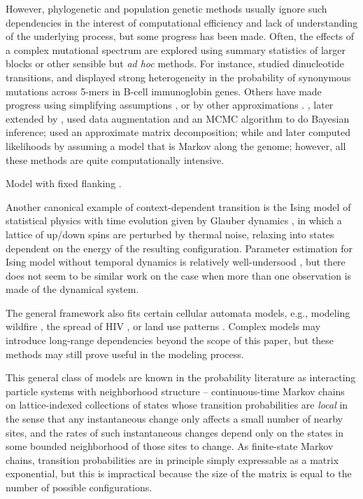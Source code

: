 \documentclass{article}
\theoremstyle{plain}
\theoremstyle{definition}
\begin{document}
However, phylogenetic and population genetic methods usually ignore such dependencies
in the interest of computational efficiency and lack of understanding of the underlying process,
but some progress has been made.
Often, the effects of a complex mutational spectrum are explored using summary statistics of larger blocks or other sensible but \textit{ad hoc} methods.
For instance, \citet{arndt2003sequence} studied dinucleotide transitions,
and \citet{yaari2013models} displayed strong heterogeneity in the probability of synonymous mutations across 5-mers
in B-cell immunoglobin genes.
Others have made progress using simplifying assumptions \citep{berard2012accurate},
or by other approximations \citep{christensen2005pseudolikelihood}.
\citet{pedersen2000dependent}, later extended by
\citet{Hwang2004-pj,hobolth2008markov,baele2010using}, used data augmentation and an MCMC algorithm to do Bayesian inference;
\citet{lunter2004nucleotide} used an approximate matrix decomposition;
while \citet{siepel2004phylogenetic} and later \citep{baele2010modelling} computed likelihoods by assuming a model that is Markov along the genome;
however, all these methods are quite computationally intensive.

Model with fixed flanking \citet{saunders2007insights}.

Another canonical example of context-dependent transition is the Ising model of statistical physics
with time evolution given by Glauber dynamics \citep{glauber1963timedependent},
in which a lattice of up/down spins are perturbed by thermal noise,
relaxing into states dependent on the energy of the resulting configuration.
Parameter estimation for Ising model without temporal dynamics
is relatively well-undersood \citep{pickard1982inference,frigessi1990parameter},
but there does not seem to be similar work on the case when more than one observation is made of the dynamical system.

The general framework also fits certain cellular automata models,
e.g., modeling wildfire \citep{clarke1994cellular},
the spread of HIV \citep{zorzenondossantos2001dynamics},
or land use patterns \citep{wu2002calibration}.
Complex models may introduce long-range dependencies beyond the scope of this paper,
but these methods may still prove useful in the modeling process.


This general class of models are known in the probability literature as
interacting particle systems \citep{liggett2005ips} with neighborhood structure
-- continuous-time Markov chains on lattice-indexed collections of states
whose transition probabilities are \emph{local}
in the sense that any instantaneous change only affects a small number of nearby sites,
and the rates of such instantaneous changes depend only on the states in some bounded neighborhood of those sites to change.
As finite-state Markov chains,
transition probabilities are in principle simply expressable as a matrix exponential,
but this is impractical because the size of the matrix is equal to the number of possible configurations.
\end{document}

